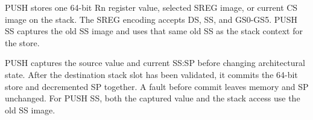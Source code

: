 PUSH stores one 64-bit Rn register value, selected SREG image, or current CS image on the stack. The SREG encoding accepts DS, SS, and GS0-GS5. PUSH SS captures the old SS image and uses that same old SS as the stack context for the store.

PUSH captures the source value and current SS:SP before changing architectural state. After the destination stack slot has been validated, it commits the 64-bit store and decremented SP together. A fault before commit leaves memory and SP unchanged. For PUSH SS, both the captured value and the stack access use the old SS image.
